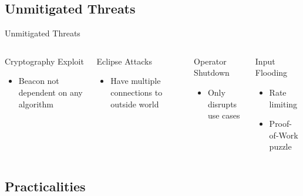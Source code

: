 \subsection{Unmitigated Threats}

\begin{frame}{Unmitigated Threats}
    \begin{columns}[T,onlytextwidth]

        \begin{block}{Cryptography Exploit}
            \begin{itemize}
                
                \item Beacon not dependent on any algorithm
            \end{itemize}
        \end{block}

        \begin{block}{Eclipse Attacks}
            \begin{itemize}
                \item Have multiple connections to outside world
            \end{itemize}
        \end{block}


        \begin{block}{Operator Shutdown}
            \begin{itemize}
                \item Only disrupts use cases
            \end{itemize}
        \end{block}

        \begin{block}{Input Flooding}
          \begin{itemize}
              \item Rate limiting
              \item Proof-of-Work puzzle
          \end{itemize}
        \end{block}

    \end{columns}
\end{frame}

\subsection{Practicalities}

